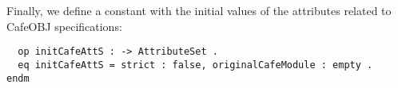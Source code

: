 

{\codesize
\begin{comment}
  crl [init-lemma-cafe] :
      < O : X@Database | db : DB, input : ('init_by_.['token[T],'bubble[T']]),
                         output : nil, pTree : P, currentGoal : GID,
                         language : cafeobj, Atts >
   =>  < O : X@Database | db : DB', input : if QIL == 'OK
                                            then 'show`goal`..@Command@
                                            else nilTermList
                                            fi,
                          output : if QIL == 'OK
                                   then '\g 'INFO: '\o 'Lemma downQidList(T)
                                        'is 'initialized! '\n
                                   else QIL
                                   fi,
                          pTree : if QIL == 'OK
                                  then replacePTree(P, GID, P')
                                  else P
                                  fi, currentGoal : GID, language : cafeobj, Atts >
   if GID =/= 'nil /\
      << DB' ; P' ; QIL >> := procInitLemmaCafe(DB, getPTree(P,GID), downQidList(T),
                                                downQidList(T')) .

  rl [init-lemmar-noGoal-cafe] :
     < O : X@Database | input : ('init_by_.['token[T],'bubble[T']]), output : nil,
                        currentGoal : 'nil, language : cafeobj, Atts >
  => < O : X@Database | input : nilTermList,
                        output : ('\r 'ERROR: '\o 'No 'goal 'is 'specified!) ,
                        currentGoal : 'nil, language : cafeobj, Atts > .
\end{comment}
}

Finally, we define a constant with the initial values of the attributes related to
CafeOBJ specifications:


{\codesize
\begin{verbatim}
  op initCafeAttS : -> AttributeSet .
  eq initCafeAttS = strict : false, originalCafeModule : empty .
endm

\end{verbatim}
}
